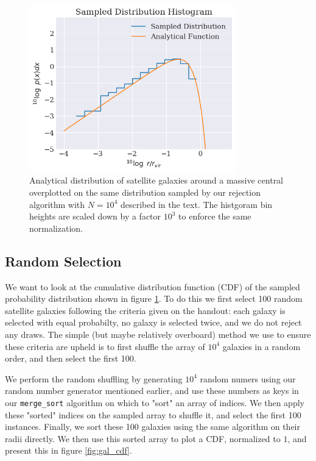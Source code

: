 \begin{figure}
    \centering
    \includegraphics[width=0.8\textwidth]{results/satellite_galaxies_pdf.png}
    \caption{Analytical distribution of satellite galaxies around a massive central overplotted on the same distribution sampled by our rejection algorithm with $N=10^4$ described in the text. The histgoram bin heights are scaled down by a factor $10^3$ to enforce the same normalization.}
    \label{fig:gal_pdf}
\end{figure}



\subsection{Random Selection}

We want to look at the cumulative distribution function (CDF) of the sampled probability distribution shown in figure \ref{fig:gal_pdf}. To do this we first select 100 random satellite galaxies following the criteria given on the handout: each galaxy is selected with equal probabilty, no galaxy is selected twice, and we do not reject any draws. The simple (but maybe relatively overboard) method we use to ensure these criteria are upheld is to first shuffle the array of $10^4$ galaxies in a random order, and then select the first 100.

We perform the random shuffling by generating $10^4$ random numers using our random number generator mentioned earlier, and use these numbers as keys in our \texttt{merge\_sort} algorithm on which to "sort" an array of indices. We then apply these "sorted" indices on the sampled array to shuffle it, and select the first 100 instances. Finally, we sort these 100 galaxies using the same algorithm on their radii directly. We then use this sorted array to plot a CDF, normalized to $1$, and present this in figure \ref{fig:gal_cdf}.

